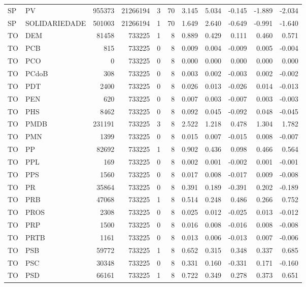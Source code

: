 \begin{landscape}
\begin{longtable}{llrrrrrrrrr}
SP & PV & 955373 & 21266194 & 3 & 70 & 3.145 & 5.034 & -0.145 & -1.889 & -2.034 \\
SP & SOLIDARIEDADE & 501003 & 21266194 & 1 & 70 & 1.649 & 2.640 & -0.649 & -0.991 & -1.640 \\
TO & DEM & 81458 & 733225 & 1 & 8 & 0.889 & 0.429 & 0.111 & 0.460 & 0.571 \\
TO & PCB & 815 & 733225 & 0 & 8 & 0.009 & 0.004 & -0.009 & 0.005 & -0.004 \\
TO & PCO & 0 & 733225 & 0 & 8 & 0.000 & 0.000 & 0.000 & 0.000 & 0.000 \\
TO & PCdoB & 308 & 733225 & 0 & 8 & 0.003 & 0.002 & -0.003 & 0.002 & -0.002 \\
TO & PDT & 2400 & 733225 & 0 & 8 & 0.026 & 0.013 & -0.026 & 0.014 & -0.013 \\
TO & PEN & 620 & 733225 & 0 & 8 & 0.007 & 0.003 & -0.007 & 0.003 & -0.003 \\
TO & PHS & 8462 & 733225 & 0 & 8 & 0.092 & 0.045 & -0.092 & 0.048 & -0.045 \\
TO & PMDB & 231191 & 733225 & 3 & 8 & 2.522 & 1.218 & 0.478 & 1.304 & 1.782 \\
TO & PMN & 1399 & 733225 & 0 & 8 & 0.015 & 0.007 & -0.015 & 0.008 & -0.007 \\
TO & PP & 82692 & 733225 & 1 & 8 & 0.902 & 0.436 & 0.098 & 0.466 & 0.564 \\
TO & PPL & 169 & 733225 & 0 & 8 & 0.002 & 0.001 & -0.002 & 0.001 & -0.001 \\
TO & PPS & 1560 & 733225 & 0 & 8 & 0.017 & 0.008 & -0.017 & 0.009 & -0.008 \\
TO & PR & 35864 & 733225 & 0 & 8 & 0.391 & 0.189 & -0.391 & 0.202 & -0.189 \\
TO & PRB & 47068 & 733225 & 1 & 8 & 0.514 & 0.248 & 0.486 & 0.266 & 0.752 \\
TO & PROS & 2308 & 733225 & 0 & 8 & 0.025 & 0.012 & -0.025 & 0.013 & -0.012 \\
TO & PRP & 1500 & 733225 & 0 & 8 & 0.016 & 0.008 & -0.016 & 0.008 & -0.008 \\
TO & PRTB & 1161 & 733225 & 0 & 8 & 0.013 & 0.006 & -0.013 & 0.007 & -0.006 \\
TO & PSB & 59772 & 733225 & 1 & 8 & 0.652 & 0.315 & 0.348 & 0.337 & 0.685 \\
TO & PSC & 30348 & 733225 & 0 & 8 & 0.331 & 0.160 & -0.331 & 0.171 & -0.160 \\
TO & PSD & 66161 & 733225 & 1 & 8 & 0.722 & 0.349 & 0.278 & 0.373 & 0.651 \\

\end{longtable}
\end{landscape}
